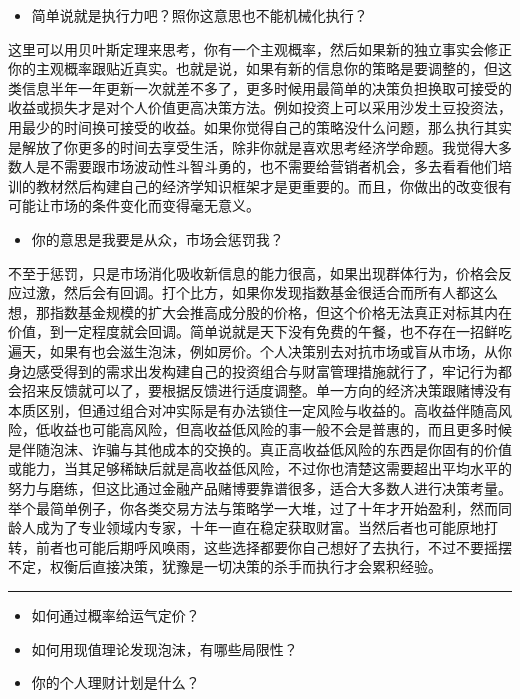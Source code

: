 \documentclass[
  letterpaper,
  DIV=11,
  numbers=noendperiod]{scrreprt}
\providecommand{\tightlist}{%
  \setlength{\itemsep}{0pt}\setlength{\parskip}{0pt}}\usepackage{longtable,booktabs,array}
\begin{document}
\begin{itemize}
\tightlist
\item
  简单说就是执行力吧？照你这意思也不能机械化执行？
\end{itemize}

这里可以用贝叶斯定理来思考，你有一个主观概率，然后如果新的独立事实会修正你的主观概率跟贴近真实。也就是说，如果有新的信息你的策略是要调整的，但这类信息半年一年更新一次就差不多了，更多时候用最简单的决策负担换取可接受的收益或损失才是对个人价值更高决策方法。例如投资上可以采用沙发土豆投资法，用最少的时间换可接受的收益。如果你觉得自己的策略没什么问题，那么执行其实是解放了你更多的时间去享受生活，除非你就是喜欢思考经济学命题。我觉得大多数人是不需要跟市场波动性斗智斗勇的，也不需要给营销者机会，多去看看他们培训的教材然后构建自己的经济学知识框架才是更重要的。而且，你做出的改变很有可能让市场的条件变化而变得毫无意义。

\begin{itemize}
\tightlist
\item
  你的意思是我要是从众，市场会惩罚我？
\end{itemize}

不至于惩罚，只是市场消化吸收新信息的能力很高，如果出现群体行为，价格会反应过激，然后会有回调。打个比方，如果你发现指数基金很适合而所有人都这么想，那指数基金规模的扩大会推高成分股的价格，但这个价格无法真正对标其内在价值，到一定程度就会回调。简单说就是天下没有免费的午餐，也不存在一招鲜吃遍天，如果有也会滋生泡沫，例如房价。个人决策别去对抗市场或盲从市场，从你身边感受得到的需求出发构建自己的投资组合与财富管理措施就行了，牢记行为都会招来反馈就可以了，要根据反馈进行适度调整。单一方向的经济决策跟赌博没有本质区别，但通过组合对冲实际是有办法锁住一定风险与收益的。高收益伴随高风险，低收益也可能高风险，但高收益低风险的事一般不会是普惠的，而且更多时候是伴随泡沫、诈骗与其他成本的交换的。真正高收益低风险的东西是你固有的价值或能力，当其足够稀缺后就是高收益低风险，不过你也清楚这需要超出平均水平的努力与磨练，但这比通过金融产品赌博要靠谱很多，适合大多数人进行决策考量。举个最简单例子，你各类交易方法与策略学一大堆，过了十年才开始盈利，然而同龄人成为了专业领域内专家，十年一直在稳定获取财富。当然后者也可能原地打转，前者也可能后期呼风唤雨，这些选择都要你自己想好了去执行，不过不要摇摆不定，权衡后直接决策，犹豫是一切决策的杀手而执行才会累积经验。

\begin{center}\rule{0.5\linewidth}{0.5pt}\end{center}

\begin{itemize}
\tightlist
\item
  如何通过概率给运气定价？
\item
  如何用现值理论发现泡沫，有哪些局限性？
\item
  你的个人理财计划是什么？
\end{itemize}
\end{document}
